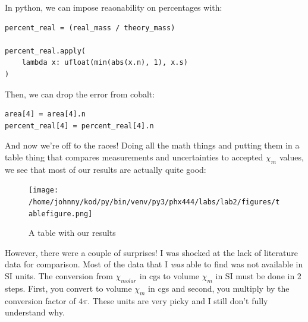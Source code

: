 \documentclass{article}
\begin{document}
In python, we can impose reaonability on percentages with: 

\begin{center}
\begin{minipage}[t]{.75\textwidth}
\begin{lstlisting}[frame=tlrb]
percent_real = (real_mass / theory_mass)

percent_real.apply(
    lambda x: ufloat(min(abs(x.n), 1), x.s)
)
\end{lstlisting}
\end{minipage}
\end{center}

Then, we can drop the error from cobalt:

\begin{center}
\begin{minipage}[t]{.75\textwidth}
\begin{lstlisting}[frame=tlrb]
area[4] = area[4].n
percent_real[4] = percent_real[4].n
\end{lstlisting}
\end{minipage}
\end{center}

And now we're off to the races! Doing all the math things and putting them in a
table thing that compares measurements and uncertainties to accepted $\chi_m$
values, we see that most of our results are actually quite good:

\begin{figure}[H]
        \begin{center}
        \texttt{[image: /home/johnny/kod/py/bin/venv/py3/phx444/labs/lab2/figures/tablefigure.png]}
        \caption{A table with our results}
        \label{fig:fig_4}
        \end{center}
\end{figure}

However, there were a couple of surprises! I was shocked at the lack
of literature data for comparison. Most of the data that I \textit{was} able to
find was not available in SI units. The conversion from $\chi_{molar}$ in cgs
to volume $\chi_m$ in SI must be done in 2 steps. First, you convert to volume
$\chi_m$ in cgs and second, you multiply by the conversion factor of $4 \pi$.
These units are very picky and I still don't fully understand why.
\end{document}
